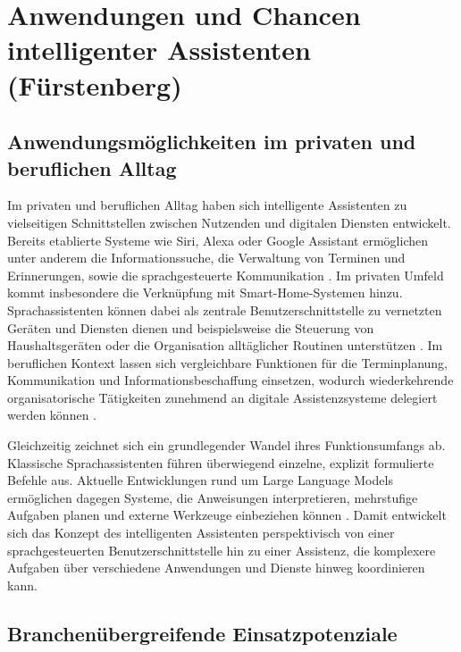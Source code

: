 \section{Anwendungen und Chancen intelligenter Assistenten (Fürstenberg)}
\label{sec:chancen}

\subsection{Anwendungsmöglichkeiten im privaten und beruflichen Alltag}

Im privaten und beruflichen Alltag haben sich intelligente Assistenten zu vielseitigen Schnittstellen zwischen Nutzenden und digitalen Diensten entwickelt. Bereits etablierte Systeme wie Siri, Alexa oder Google Assistant ermöglichen unter anderem die Informationssuche, die Verwaltung von Terminen und Erinnerungen, sowie die sprachgesteuerte Kommunikation \cite{silva2020intelligent}. Im privaten Umfeld kommt insbesondere die Verknüpfung mit Smart-Home-Systemen hinzu. Sprachassistenten können dabei als zentrale Benutzerschnittstelle zu vernetzten Geräten und Diensten dienen und beispielsweise die Steuerung von Haushaltsgeräten oder die Organisation alltäglicher Routinen unterstützen \cite{minder2023voice}. Im beruflichen Kontext lassen sich vergleichbare Funktionen für die Terminplanung, Kommunikation und Informationsbeschaffung einsetzen, wodurch wiederkehrende organisatorische Tätigkeiten zunehmend an digitale Assistenzsysteme delegiert werden können \cite{silva2020intelligent}.

Gleichzeitig zeichnet sich ein grundlegender Wandel ihres Funktionsumfangs ab. Klassische Sprachassistenten führen überwiegend einzelne, explizit formulierte Befehle aus. Aktuelle Entwicklungen rund um Large Language Models ermöglichen dagegen Systeme, die Anweisungen interpretieren, mehrstufige Aufgaben planen und externe Werkzeuge einbeziehen können \cite{chowa2026language}. Damit entwickelt sich das Konzept des intelligenten Assistenten perspektivisch von einer sprachgesteuerten Benutzerschnittstelle hin zu einer Assistenz, die komplexere Aufgaben über verschiedene Anwendungen und Dienste hinweg koordinieren kann.

\subsection{Branchenübergreifende Einsatzpotenziale}

